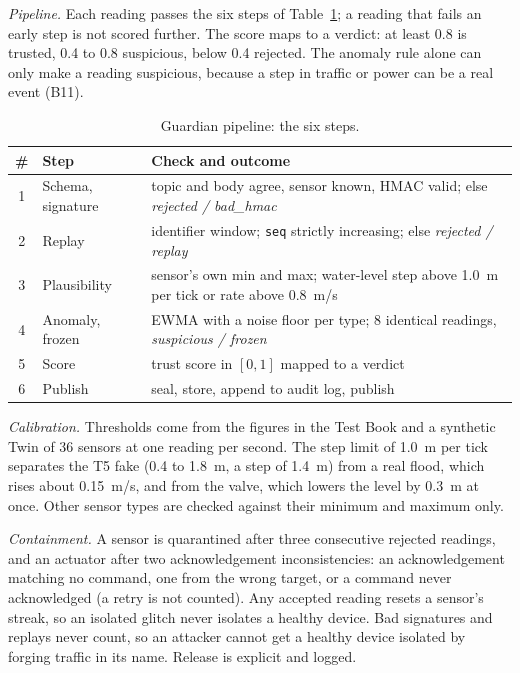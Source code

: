 \documentclass[conference]{IEEEtran}
\newcommand{\code}[1]{\texttt{\small #1}}
\begin{document}
\emph{Pipeline.} Each reading passes the six steps of Table~\ref{tab:gpipe}; a reading that fails an early step is not scored
further. The score maps to a verdict: at least 0.8 is trusted, 0.4 to 0.8 suspicious, below 0.4 rejected. The anomaly rule alone
can only make a reading suspicious, because a step in traffic or power can be a real event (B11).

\begin{table}[t]
\centering
\caption{Guardian pipeline: the six steps.}
\label{tab:gpipe}
\footnotesize
\renewcommand{\arraystretch}{1.05}
\begin{tabular}{@{}c p{1.9cm} p{4.6cm}@{}}
\toprule
\textbf{\#} & \textbf{Step} & \textbf{Check and outcome}\\
\midrule
1 & Schema, signature & topic and body agree, sensor known, HMAC valid; else \emph{rejected / bad\_hmac}\\
2 & Replay & identifier window; \code{seq} strictly increasing; else \emph{rejected / replay}\\
3 & Plausibility & sensor's own min and max; water-level step above 1.0~m per tick or rate above 0.8~m/s\\
4 & Anomaly, frozen & EWMA with a noise floor per type; 8 identical readings, \emph{suspicious / frozen}\\
5 & Score & trust score in $[0,1]$ mapped to a verdict\\
6 & Publish & seal, store, append to audit log, publish\\
\bottomrule
\end{tabular}
\end{table}

\emph{Calibration.} Thresholds come from the figures in the Test Book and a synthetic Twin of 36 sensors at one reading per
second. The step limit of 1.0~m per tick separates the T5 fake (0.4 to 1.8~m, a step of 1.4~m) from a real flood, which rises
about 0.15~m/s, and from the valve, which lowers the level by 0.3~m at once. Other sensor types are checked against their
minimum and maximum only.

\emph{Containment.} A sensor is quarantined after three consecutive rejected readings, and an actuator after two
acknowledgement inconsistencies: an acknowledgement matching no command, one from the wrong target, or a command never
acknowledged (a retry is not counted). Any accepted reading resets a sensor's streak, so an isolated glitch never isolates a
healthy device. Bad signatures and replays never count, so an attacker cannot get a healthy device isolated by forging traffic
in its name. Release is explicit and logged.
\end{document}
